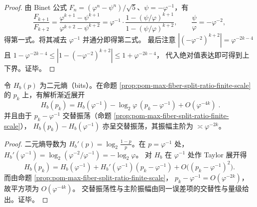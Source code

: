 \begin{proof}
由 Binet 公式 \(F_n=(\varphi^n-\psi^n)/\sqrt5\)、\(\psi=-\varphi^{-1}\)，有
\[
\frac{F_{k+1}}{F_{k+2}}
=\frac{\varphi^{k+1}-\psi^{k+1}}{\varphi^{k+2}-\psi^{k+2}}
=\varphi^{-1}\cdot\frac{1-(\psi/\varphi)^{k+1}}{1-(\psi/\varphi)^{k+2}},
\qquad \frac{\psi}{\varphi}=-\varphi^{-2},
\]
得第一式。将其减去 \(\varphi^{-1}\) 并通分即得第二式。
最后注意 \(|(-\varphi^{-2})^{k+2}|=\varphi^{-2k-4}\) 且
\(
1-\varphi^{-2k-4}\le |1-(-\varphi^{-2})^{k+2}|\le 1+\varphi^{-2k-4}
\)，
代入绝对值表达即可得到上下界。证毕。
\end{proof}

\begin{proposition}\label{prop:pom-finite-scale-entropy-oscillation}
令 \(H_b(p)\) 为二元熵（bits）。在命题 \ref{prop:pom-max-fiber-split-ratio-finite-scale} 的 \(p_k\) 上，有解析渐近展开
\[
\boxed{\;
H_b(p_k)=H_b(\varphi^{-1})-\log_2\varphi\,(p_k-\varphi^{-1})+O(\varphi^{-4k})\; }.
\]
并且由于 \(p_k-\varphi^{-1}\) 交替振荡（命题 \ref{prop:pom-max-fiber-split-ratio-finite-scale}），
\(
H_b(p_k)-H_b(\varphi^{-1})
\)
亦呈交替振荡，其振幅主阶为 \(\asymp \varphi^{-2k}\)。
\end{proposition}

\begin{proof}
二元熵导数为 \(H_b'(p)=\log_2\frac{1-p}{p}\)。在 \(p=\varphi^{-1}\) 处，
\(
H_b'(\varphi^{-1})=\log_2(\varphi^{-2}/\varphi^{-1})=-\log_2\varphi
\)。
对 \(H_b\) 在 \(\varphi^{-1}\) 处作 Taylor 展开得
\[
H_b(p_k)=H_b(\varphi^{-1})+H_b'(\varphi^{-1})(p_k-\varphi^{-1})+O\bigl((p_k-\varphi^{-1})^2\bigr).
\]
而由命题 \ref{prop:pom-max-fiber-split-ratio-finite-scale}，
\(
p_k-\varphi^{-1}=O(\varphi^{-2k})
\)，故平方项为 \(O(\varphi^{-4k})\)。
交替振荡性与主阶振幅由同一误差项的交替性与量级给出。证毕。
\end{proof}

\endinput
